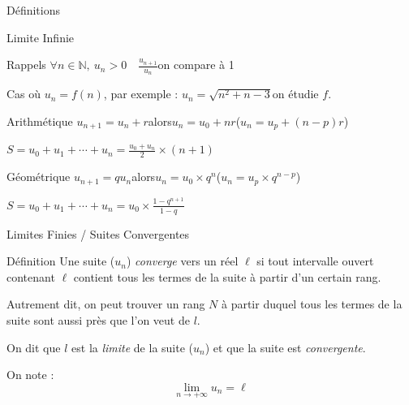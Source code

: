 \documentclass{coursbook}
\begin{document}
\begin{Gpartie}{Définitions}
\begin{Spartie}{Limite Infinie}
\begin{SSpartie}{Rappels}
                $\forall n\in\mathbb{N},\ u_n>0\quad\frac{u_{n+1}}{u_n}$\quad on compare à 1

                Cas où $u_n=f(n)$, par exemple : $u_n=\sqrt{n^2+n-3}$\quad on étudie $f$.
                \begin{SSSpartie}{Arithmétique} 
                    $u_{n+1}=u_n+r$\quad alors\quad $u_n=u_0+nr$\quad\big($u_n=u_p+(n-p)r$\big)

                    $S=u_0+u_1+\dotsb+u_n=\frac{u_0+u_n}{2}\times(n+1)$
                \end{SSSpartie}
                \begin{SSSpartie}{Géométrique} 
                    $u_{n+1}=qu_n$\quad alors\quad $u_n=u_0\times q^n$\quad\big($u_n=u_p\times q^{n-p}$\big)

                    $S=u_0+u_1+\dotsb+u_n=u_0\times\frac{1-q^{n+1}}{1-q}$
                \end{SSSpartie}
            \end{SSpartie}
        \end{Spartie}
        \pagebreak
        \begin{Spartie}{Limites Finies / Suites Convergentes} 
            \begin{SSpartie}{Définition} 
                Une suite ($u_n$) \emph{converge} vers un réel $\ell$ si tout intervalle ouvert contenant $\ell$ contient tous les termes de la suite à partir d'un certain rang.

                Autrement dit, on peut trouver un rang $N$ à partir duquel tous les termes de la suite sont aussi près que l'on veut de $l$.

                On dit que $l$ est la \emph{limite} de la suite ($u_n$) et que la suite est \emph{convergente}.

                On note : \[\boxed{\lim\limits_{n\to +\infty} u_n=\ell}\]


\end{SSpartie}
\end{Spartie}
\end{Gpartie}
\end{document}
